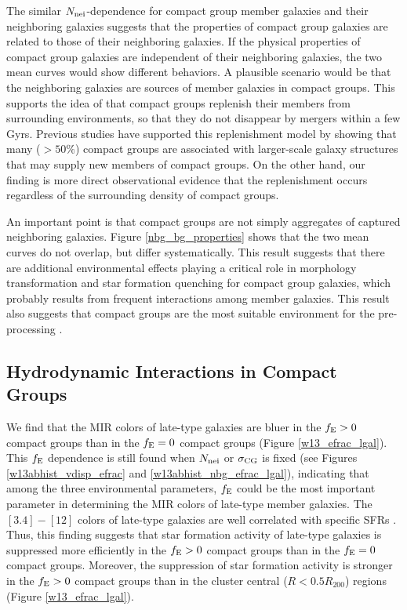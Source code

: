 \documentclass[12pt,preprint,apj]{emulateapj}
\newcommand{\efrac}{f_{\rm E}}
\newcommand{\nbg}{N_{\rm nei}}
\begin{document}
The similar $\nbg$-dependence for compact group member 
galaxies and their neighboring galaxies suggests that the properties of 
compact group galaxies are related to those of their neighboring galaxies.
If the physical properties of compact group galaxies are independent of their 
neighboring galaxies, the two mean curves would show different behaviors.
A plausible scenario would be that the neighboring galaxies are sources of 
member galaxies in compact groups. This supports the idea of \citet{diaferio+94} 
that compact groups replenish their members from surrounding environments, 
so that they do not disappear by mergers within a few Gyrs. 
Previous studies have supported this replenishment model by showing that 
many ($>50\%$) compact groups are associated with larger-scale galaxy structures
that may supply new members of compact groups. On the other hand, 
our finding is more direct observational evidence that the replenishment 
occurs regardless of the surrounding density of compact groups. 
 
An important point is that compact groups are not 
simply aggregates of captured neighboring galaxies. 
Figure \ref{nbg_bg_properties} shows that the two mean curves do not overlap, 
but differ systematically. This result suggests that there are additional environmental 
effects playing a critical role in morphology transformation and star formation 
quenching for compact group galaxies, which probably results from 
frequent interactions among member galaxies. 
This result also suggests that compact groups are the most suitable 
environment for the pre-processing \citep{zabludoff98}. 

\subsection{Hydrodynamic Interactions in Compact Groups}


We find that the MIR colors of late-type galaxies are bluer 
in the $\efrac>0$ compact groups than in the $\efrac=0$ compact groups 
(Figure \ref{w13_efrac_lgal}).
This $\efrac$ dependence is still found when $\nbg$ 
or $\sigma_{\rm CG}$ 
is fixed (see Figures \ref{w13abhist_vdisp_efrac} and 
\ref{w13abhist_nbg_efrac_lgal}), indicating that among the three environmental 
parameters,
$\efrac$ could be the most important parameter in determining the MIR colors 
of late-type member galaxies.
The $[3.4]-[12]$ colors of late-type galaxies are well correlated with specific 
SFRs \citep{donoso+12,hwang+12b}.
Thus, this finding suggests that star formation activity of late-type galaxies 
is suppressed more efficiently in the $\efrac>0$ compact groups than 
in the $\efrac=0$ compact groups. 
Moreover, the suppression of star formation activity is stronger 
in the $\efrac>0$ compact groups than in the cluster central ($R<0.5R_{200}$) regions
(Figure \ref{w13_efrac_lgal}).
\end{document}
